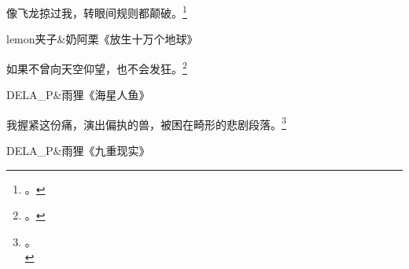 \hfill\begin{minipage}{0.55\textwidth}
\fontsize{8pt}{12pt}\selectfont\fontsize{8pt}{12pt} %
像飞龙掠过我，转眼间规则都颠破。\footnote{。}

\raggedleft lemon夹子\&奶阿栗《放生十万个地球》

\raggedright 如果不曾向天空仰望，也不会发狂。\footnote{\another{}。}

\raggedleft DELA\_P\&雨狸《海星人鱼》

\raggedright 我握紧这份痛，演出偏执的兽，被困在畸形的悲剧段落。\footnote{\another{}。\\}

\raggedleft DELA\_P\&雨狸《九重现实》
\end{minipage}

